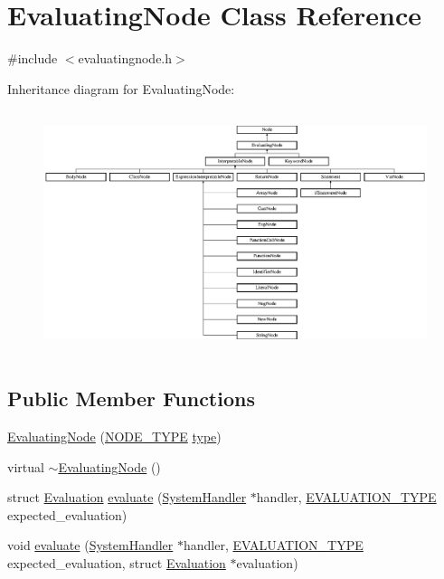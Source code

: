 \hypertarget{classEvaluatingNode}{}\section{Evaluating\+Node Class Reference}
\label{classEvaluatingNode}


{\ttfamily \#include $<$evaluatingnode.\+h$>$}

Inheritance diagram for Evaluating\+Node\+:\begin{figure}[H]
\begin{center}
\leavevmode
\includegraphics[height=7.140255cm]{classEvaluatingNode}
\end{center}
\end{figure}
\subsection*{Public Member Functions}
\begin{DoxyCompactItemize}
\item 
\hyperlink{classEvaluatingNode_a0ece59961a22a6f07d53e75f41707683}{Evaluating\+Node} (\hyperlink{statics_8h_a1ec6d4bfce2e004debbc141eafc512db}{N\+O\+D\+E\+\_\+\+T\+Y\+PE} \hyperlink{classNode_af4f536b1b3f60e197fe364ba56022291}{type})
\item 
virtual \hyperlink{classEvaluatingNode_aac142cb781f91833f01c537f3b76b1d2}{$\sim$\+Evaluating\+Node} ()
\item 
struct \hyperlink{structEvaluation}{Evaluation} \hyperlink{classEvaluatingNode_a49e3ccc15a4fc2d4ecd4d264c86dea5e}{evaluate} (\hyperlink{classSystemHandler}{System\+Handler} $\ast$handler, \hyperlink{statics_8h_a6664c451ca7787483a7981cc1de68dbb}{E\+V\+A\+L\+U\+A\+T\+I\+O\+N\+\_\+\+T\+Y\+PE} expected\+\_\+evaluation)
\item 
void \hyperlink{classEvaluatingNode_ae20449b7c2e423d64664503befd47ba0}{evaluate} (\hyperlink{classSystemHandler}{System\+Handler} $\ast$handler, \hyperlink{statics_8h_a6664c451ca7787483a7981cc1de68dbb}{E\+V\+A\+L\+U\+A\+T\+I\+O\+N\+\_\+\+T\+Y\+PE} expected\+\_\+evaluation, struct \hyperlink{structEvaluation}{Evaluation} $\ast$evaluation)
\end{DoxyCompactItemize}
